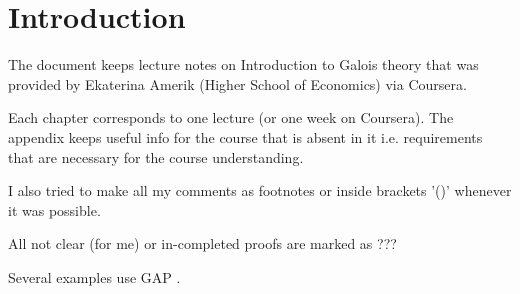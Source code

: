 \chapter*{Introduction}

The document keeps lecture notes on Introduction to Galois theory that
was provided by Ekaterina Amerik (Higher School of Economics) via
Coursera.

Each chapter corresponds to one lecture (or one week on Coursera). The
appendix keeps useful info for the course that is absent in it
i.e. requirements that are necessary for the course understanding.

I also tried to make all my comments as footnotes or inside brackets '()'
whenever it was possible.

All not clear (for me) or in-completed proofs are marked as ???

Several examples use GAP \cite{url:gap}.

